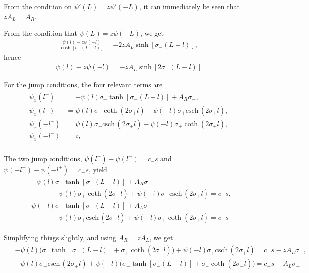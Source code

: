 \documentclass[a4paper,10pt]{article}
\newcommand{\sI}{\ensuremath{\sigma}}
\newcommand{\csch}{\mathrm{csch} \,}
\begin{document}
From the condition on $\psi'(L) = z\psi'(-L)$, it can immediately be seen that $zA_L = A_R$.

From the condition that $\psi(L) = z\psi(-L)$, we get
% 
\begin{equation*}
\begin{split}
	\frac{\psi(l)-z\psi(-l)}{\cosh[\sI_-(L-l)]} = -2zA_L\sinh[\sI_-(L-l)],
\end{split}
\end{equation*}
% 
hence
% 
\begin{equation}
\label{eqn:floquet1}
\begin{split}
	\psi(l)-z\psi(-l) = -zA_L\sinh[2\sI_-(L-l)]
\end{split}
\end{equation}
% 

For the jump conditions, the four relevant terms are
% 
\begin{equation*}
\begin{split}
\begin{aligned}
	\psi_x(l^+) &= -\psi(l)\sI_-\tanh[\sI_-(L-l)] + A_R\sI_-,\\
	\psi_x(l^-) &=  \psi(l)\sI_+\coth(2\sI_+l) - \psi(-l)\sI_+\csch(2\sI_+l),\\
	\psi_x(-l^+) &= \psi(l)\sI_+\csch(2\sI_+l) - \psi(-l)\sI_+\coth(2\sI_+l),\\
	\psi_x(-l^-) &= c,\\
\end{aligned}
\end{split}
\end{equation*}
% 

The two jump conditions, $\psi(l^+) - \psi(l^-) = c_+s$ and $\psi(-l^-) - \psi(-l^+) = c_-s$, yield
% 
\begin{equation*}
\begin{split}
\begin{aligned}
	& -\psi(l)\sI_-\tanh[\sI_-(L-l)] + A_R\sI_- - \\
	 & \qquad\qquad \psi(l)\sI_+\coth(2\sI_+l) + \psi(-l)\sI_+\csch(2\sI_+l) = c_+s,\\
	&\psi(-l)\sI_-\tanh[\sI_-(L-l)] + A_L\sI_- -  \\
	 & \qquad\qquad \psi(l)\sI_+\csch(2\sI_+l) + \psi(-l)\sI_+\coth(2\sI_+l) = c_-s
\end{aligned}
\end{split}
\end{equation*}
% 

Simplifying things slightly, and using $A_R = zA_L$, we get
% 
\begin{equation}
\label{eqn:psii}
\begin{split}
\begin{aligned}
	& -\psi(l)\big(\sI_-\tanh[\sI_-(L-l)] + \sI_+\coth(2\sI_+l) \big) + \psi(-l)\sI_+\csch(2\sI_+l) = c_+s - zA_L\sI_-,\\
	& -\psi(l)\sI_+\csch(2\sI_+l) + \psi(-l)\big(\sI_-\tanh[\sI_-(L-l)] + \sI_+\coth(2\sI_+l)\big)  = c_-s - A_L\sI_-
\end{aligned}
\end{split}
\end{equation}
% 
\end{document}
